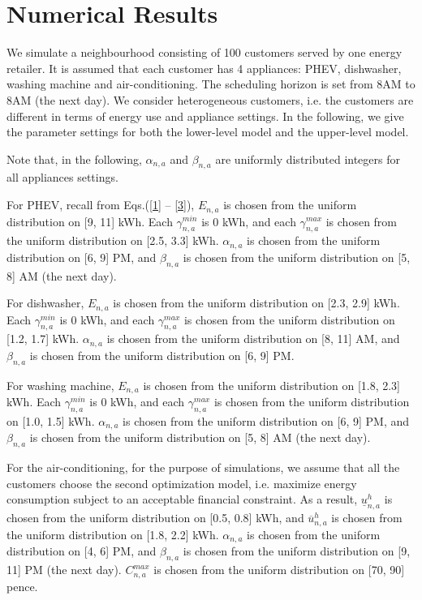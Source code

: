 \documentclass[10pt,journal]{IEEEtran}
\theoremstyle{definition}
\theoremstyle{plain} \newtheorem{theo}{Theorem} \newtheorem{prop}{Proposition}  \newtheorem{lemm}{Lemma}
\begin{document}
\section{Numerical Results} \label{results}

We simulate a neighbourhood consisting of 100 customers served by one energy retailer. It is assumed that each customer has 4 appliances: PHEV, dishwasher, washing machine and air-conditioning. The scheduling horizon is set from 8AM to 8AM (the next day). We consider heterogeneous customers, i.e. the customers are different in terms of energy use and appliance settings. In the following, we give the parameter settings for both the lower-level model and the upper-level model. 


Note that, in the following, $\alpha_{n,a}$ and $\beta_{n,a}$ are uniformly distributed integers for all appliances settings.



For PHEV, recall from Eqs.(\ref{1} -- \ref{3}), $E_{n,a}$ is chosen from the uniform distribution on [9, 11] kWh. Each $\gamma_{n,a}^{min}$ is $0$ kWh, and each $\gamma_{n,a}^{max}$ is chosen  from the uniform distribution on [2.5, 3.3] kWh. $\alpha_{n,a}$ is chosen from the uniform distribution on [6, 9] PM, and $\beta_{n,a}$ is chosen from the uniform distribution on [5, 8] AM (the next day).

For dishwasher, $E_{n,a}$ is chosen from the uniform distribution on [2.3, 2.9] kWh. Each $\gamma_{n,a}^{min}$ is $0$ kWh, and each $\gamma_{n,a}^{max}$ is chosen from the uniform distribution on [1.2, 1.7] kWh. $\alpha_{n,a}$ is chosen from the uniform distribution on [8, 11] AM, and $\beta_{n,a}$ is chosen from the uniform distribution on [6, 9] PM. 

For washing machine, $E_{n,a}$ is chosen from the uniform distribution on [1.8, 2.3] kWh. Each $\gamma_{n,a}^{min}$ is $0$ kWh, and each $\gamma_{n,a}^{max}$ is chosen from the uniform distribution on [1.0, 1.5] kWh. $\alpha_{n,a}$ is chosen from the uniform distribution on [6, 9] PM, and $\beta_{n,a}$ is chosen from the uniform distribution on [5, 8] AM (the next day).  

For the air-conditioning, for the purpose of simulations, we assume that all the customers choose the second optimization model, i.e. maximize energy consumption subject to an acceptable financial constraint. As a result, $\underline{u}_{n,a}^h$ is chosen from the uniform distribution on [0.5, 0.8] kWh, and $\overline{u}_{n,a}^h$ is chosen from the uniform distribution on [1.8, 2.2] kWh. $\alpha_{n,a}$ is chosen from the uniform distribution on [4, 6] PM, and $\beta_{n,a}$ is chosen from the uniform distribution on [9, 11] PM (the next day).
$C_{n,a}^{max}$ is chosen from the uniform distribution on [70, 90] pence. 
\end{document}
